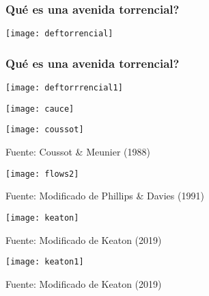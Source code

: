 \documentclass{beamer}
\begin{document}
\begin{frame}
\frametitle{Qué es una avenida torrencial?}
\begin{center}
   	\texttt{[image: deftorrencial]}
\end{center}
\end{frame}
\begin{frame}
\frametitle{Qué es una avenida torrencial?}
\begin{center}
   	\texttt{[image: deftorrrencial1]}
\end{center}
\end{frame}
\begin{frame}
\begin{center}
   	\texttt{[image: cauce]}
\end{center}
\end{frame}
\begin{frame}
\begin{center}
   	\texttt{[image: coussot]}
\end{center}
\tiny{Fuente: Coussot \& Meunier (1988) }
\end{frame}
\begin{frame}
\begin{center}
   	\texttt{[image: flows2]}
\end{center}
\tiny{Fuente: Modificado de Phillips \& Davies (1991)}
\end{frame}
\begin{frame}
\begin{center}
   	\texttt{[image: keaton]}
\end{center}
\tiny{Fuente: Modificado de Keaton (2019)}
\end{frame}
\begin{frame}
\begin{center}
   	\texttt{[image: keaton1]}
\end{center}
\tiny{Fuente: Modificado de Keaton (2019)}
\end{frame}
\end{document}
